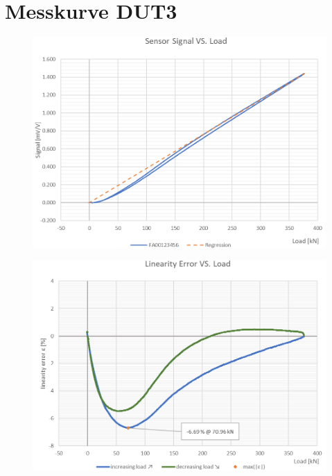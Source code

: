 \documentclass[12pt,a4paper]{article}
\begin{document}
	\section{Messkurve DUT3}
\begin{figure}[H]
	\centering
	\includegraphics[width=.8\linewidth]{img/screenshot005}
	\label{fig:screenshot005}
\end{figure}
\begin{figure}[H]
	\centering
	\includegraphics[width=.8\linewidth]{img/screenshot006}
	\label{fig:screenshot006}
\end{figure}
\end{document}
